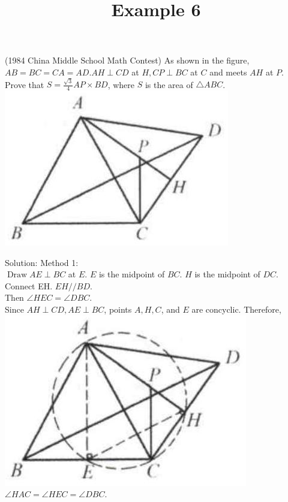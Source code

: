 \documentclass{article}
\title{Example 6}
\date{}
\begin{document}
\maketitle

(1984 China Middle School Math Contest) As shown in the figure, \(A B=B C=C A=A D . A H \perp C D\) at \(H, C P \perp B C\) at \(C\) and meets \(A H\) at \(P\). Prove that \(S=\frac{\sqrt{3}}{4} A P \times B D\), where \(S\) is the area of \(\triangle A B C\).\\
\centering
\includegraphics[width=\textwidth]{images/197(1).jpg}

Solution:
Method 1:\\
\(\operatorname{Draw} A E \perp B C\) at \(E\). \(E\) is the midpoint of \(B C\). \(H\) is the midpoint of \(D C\).\\
Connect EH. \(E H / / B D\).\\
Then \(\angle H E C=\angle D B C\).\\
Since \(A H \perp C D, A E \perp B C\), points \(A, H, C\), and \(E\) are concyclic. Therefore,\\
\centering
\includegraphics[width=\textwidth]{images/197(2).jpg}\\
\(\angle H A C=\angle H E C=\angle D B C\).
\end{document}
